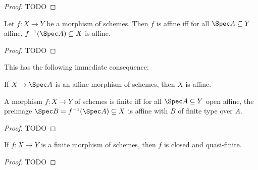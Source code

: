 \documentclass[wip, algebra]{bsteffan-lecturenotes}
\begin{document}
\begin{proof}
	TODO
\end{proof}
\begin{proposition}
	Let $f\colon X \to Y$ be a morphism of schemes.
	Then $f$ is affine iff for all $\Spec A \subseteq Y$ affine, $f^{-1}(\Spec A) \subseteq X$ is affine.
\end{proposition}
\begin{proof}
	TODO
\end{proof}
This has the following immediate consequence:
\begin{corollary}
	If $X \to \Spec A$ is an affine morphism of schemes, then $X$ is affine.
\end{corollary}
\begin{corollary}
	A morphism $f\colon X \to Y$ of schemes is finite iff for all $\Spec A \subseteq Y$ open affine, the preimage $\Spec B = f^{-1}(\Spec A) \subseteq X$ is affine with $B$ of finite type over $A$.
\end{corollary}
\begin{proof}
	TODO
\end{proof}
\begin{proposition}
	If $f\colon X \to Y$ is a finite morphism of schemes, then $f$ is closed and quasi-finite.
\end{proposition}
\begin{proof}
	TODO
\end{proof}
\end{document}

